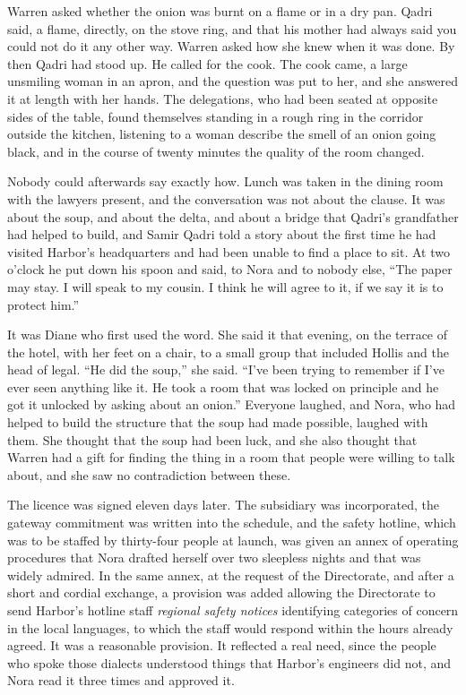 Warren asked whether the onion was burnt on a flame or in a dry pan. Qadri said, a flame, directly, on the stove ring, and that his mother had always said you could not do it any other way. Warren asked how she knew when it was done. By then Qadri had stood up. He called for the cook. The cook came, a large unsmiling woman in an apron, and the question was put to her, and she answered it at length with her hands. The delegations, who had been seated at opposite sides of the table, found themselves standing in a rough ring in the corridor outside the kitchen, listening to a woman describe the smell of an onion going black, and in the course of twenty minutes the quality of the room changed.

Nobody could afterwards say exactly how. Lunch was taken in the dining room with the lawyers present, and the conversation was not about the clause. It was about the soup, and about the delta, and about a bridge that Qadri's grandfather had helped to build, and Samir Qadri told a story about the first time he had visited Harbor's headquarters and had been unable to find a place to sit. At two o'clock he put down his spoon and said, to Nora and to nobody else, ``The paper may stay. I will speak to my cousin. I think he will agree to it, if we say it is to protect him.''

It was Diane who first used the word. She said it that evening, on the terrace of the hotel, with her feet on a chair, to a small group that included Hollis and the head of legal. ``He did the soup,'' she said. ``I've been trying to remember if I've ever seen anything like it. He took a room that was locked on principle and he got it unlocked by asking about an onion.'' Everyone laughed, and Nora, who had helped to build the structure that the soup had made possible, laughed with them. She thought that the soup had been luck, and she also thought that Warren had a gift for finding the thing in a room that people were willing to talk about, and she saw no contradiction between these.

The licence was signed eleven days later. The subsidiary was incorporated, the gateway commitment was written into the schedule, and the safety hotline, which was to be staffed by thirty-four people at launch, was given an annex of operating procedures that Nora drafted herself over two sleepless nights and that was widely admired. In the same annex, at the request of the Directorate, and after a short and cordial exchange, a provision was added allowing the Directorate to send Harbor's hotline staff \emph{regional safety notices} identifying categories of concern in the local languages, to which the staff would respond within the hours already agreed. It was a reasonable provision. It reflected a real need, since the people who spoke those dialects understood things that Harbor's engineers did not, and Nora read it three times and approved it.

